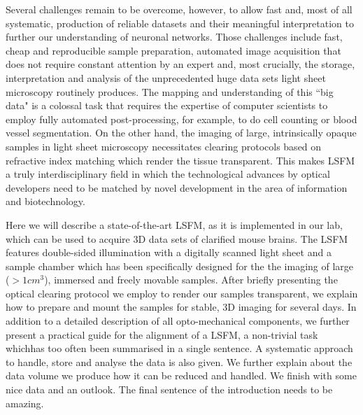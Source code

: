 \documentclass[12pt]{spieman}  %
\begin{document}
Several challenges remain to be overcome, however, to allow fast and, most of all systematic, production of reliable datasets and their meaningful interpretation to further our understanding of neuronal networks. Those challenges include fast, cheap and reproducible sample preparation, automated image acquisition that does not require constant attention by an expert and, most crucially, the storage, interpretation and analysis of the unprecedented huge data sets light sheet microscopy routinely produces. The mapping and understanding of this ``big data" is a colossal task that requires the expertise of computer scientists to employ fully automated post-processing, for example, to do cell counting or blood vessel segmentation. On the other hand, the imaging of large, intrinsically opaque samples in light sheet microscopy necessitates clearing protocols based on refractive index matching which render the tissue transparent. This makes LSFM a truly interdisciplinary field in which the technological advances by optical developers need to be matched by novel development in the area of information and biotechnology.

Here we will describe a state-of-the-art LSFM, as it is implemented in our lab, which can be used to acquire 3D data sets of clarified mouse brains. The LSFM features double-sided illumination with a digitally scanned light sheet and a sample chamber which has been specifically designed for the the imaging of large ($> 1cm^3$), immersed and freely movable samples. After briefly presenting the optical clearing protocol we employ to render our samples transparent, we explain how to prepare and mount the samples for stable, 3D imaging for several days. In addition to a detailed description of all opto-mechanical components, we further present a practical guide for the alignment of a LSFM, a non-trivial task whichhas too often been summarised in a single sentence. A systematic approach to handle, store and analyse the data is also given. We further explain about the data volume we produce how it can be reduced and handled. We finish with some nice data and an outlook.  The final sentence of the introduction needs to be amazing. 
\end{document}
